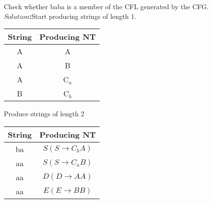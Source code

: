 \documentclass[a4]{article}
\begin{document}
\vspace*{0.2cm}
Check whether baba is a member of the CFL generated by the CFG.\\

\vspace*{0.2cm}
\textbf{$Solution$:}Start producing strings of length 1.\\

\vspace*{0.1cm}
\begin{center}
\begin{tabular}{cc}
\hline

\hline

\hline

\hline
String & Producing NT \\
\hline
A & A \\
A & B \\
A & C$_{a}$ \\
B & C$_{b}$ \\
\hline

\hline

\hline

\hline

\end{tabular}
\end{center}

\vspace*{0.1cm}
\hspace*{0.4cm}Produce strings of length 2\\
\vspace*{0.1cm}

\begin{center}
\begin{tabular}{cc}
\hline

\hline

\hline

\hline
String & Producing NT \\
\hline
ba  & $S (S \rightarrow C_{b}A)$ \\
aa  & $S (S \rightarrow C_{a}B)$ \\
aa  & $D (D \rightarrow AA)$ \\
aa  & $E (E \rightarrow BB)$ \\
\hline

\hline

\hline

\hline

\end{tabular}
\end{center}
\vspace*{0.1cm}
\end{document}
